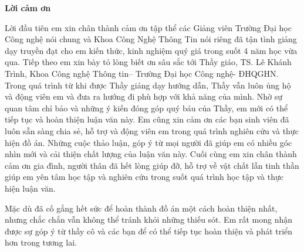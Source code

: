 \begin{center}
\textbf{\large{Lời cảm ơn}	}
\end{center}
 Lời đầu tiên em xin chân thành cảm ơn tập thể các Giảng viên Trường Đại học Công
 nghệ nói chung và Khoa Công Nghệ Thông Tin nói riêng đã tận tình giảng dạy
 truyền đạt cho em kiến thức, kinh nghiệm quý giá trong suốt 4 năm học vừa
 qua.
 \nl
 \indent Tiếp theo em xin bày tỏ lòng biết ơn sâu sắc tới Thầy giáo, TS. Lê Khánh
 Trình, Khoa Công nghệ Thông tin– Trường Đại học Công nghệ- ĐHQGHN. Trong
 quá trình từ khi được Thầy giảng dạy hướng dẫn, Thầy vẫn luôn ủng hộ và động
 viên em và đưa ra hướng đi phù hợp với khả năng của mình. Nhờ sự quan tâm chỉ bảo và những ý kiến đóng góp quý báu
 của Thầy, em mới có thể tiếp tục và hoàn thiện luận văn này.\nl
 \indent Em cũng xin cảm ơn các bạn sinh viên đã luôn sẵn sàng chia sẻ, hỗ trợ và động viên em trong quá trình nghiên cứu và thực hiện đồ án. Những cuộc thảo luận, góp ý từ mọi người đã giúp em có nhiều góc nhìn mới và cải thiện chất lượng của luận văn này.\nl
 \indent Cuối cùng em xin chân thành cảm ơn gia đình, người thân đã hết lòng giúp
 đỡ, hỗ trợ về vật chất lẫn tinh thần giúp em yên tâm học tập và nghiên cứu trong
 suốt quá trình học tập và thực hiện luận văn.

 \indent Mặc dù đã cố gắng hết sức để hoàn thành đồ án một cách hoàn thiện nhất, nhưng chắc chắn vẫn không thể tránh khỏi những thiếu sót. Em rất mong nhận được sự góp ý từ thầy cô và các bạn để có thể tiếp tục hoàn thiện và phát triển hơn trong tương lai.